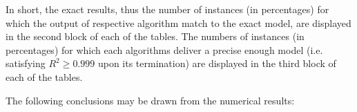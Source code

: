 \documentclass[a4paper,12pt]{elsarticle}
\begin{document}

In short, the exact results, thus the number of instances (in percentages) for which the output of respective algorithm match to the exact model, are displayed in the second block of each of the tables. The numbers of instances (in percentages) for which each algorithms deliver a precise enough model (i.e. satisfying $R^2\geq 0.999$ upon its termination) are displayed in the third block of each of the tables. 

The following conclusions may be drawn from the numerical results: 
\end{document}
